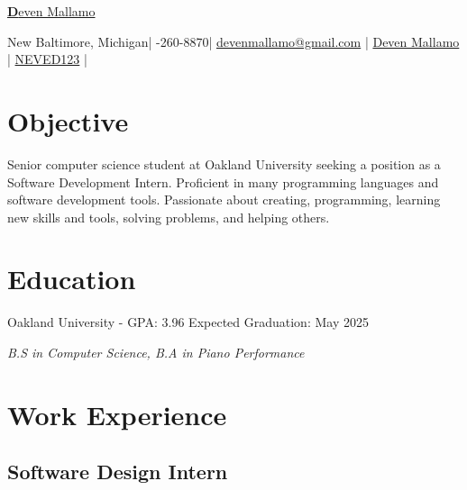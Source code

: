 \documentclass{article}
\makeatletter
\newcommand{\resumesection}[1]{
	\section*{\Large\textbf{#1}}
	\hrulefill
	\vspace{1ex}
}
\newcommand{\name}{Deven Mallamo}
\newcommand{\address}{New Baltimore, Michigan}
\newcommand{\phone}{586-260-8870}
\newcommand{\email}{devenmallamo@gmail.com}
\newcommand{\linkedin}{Deven Mallamo}
\newcommand{\github}{NEVED123}
\makeatother
\begin{document}
\begin{tcolorbox}[colback= boxfill,colframe=boxframe]
	\begin{center}
		\vspace{5pt}
		\href{https://devenmallamo.com}{\Huge \textbf \name} 

		\normalsize \vspace{10pt}

		\faHome \space \address \space | 
		\faPhone \space \phone \space |
		\href{mailto:\email}{\faEnvelope \space \email} \space | 
		\href{https://www.linkedin.com/in/deven-mallamo/}{\faLinkedin \space \linkedin} \space | 
		\href{https://github.com/NEVED123}{\faGithub \space \github} |
	\end{center}
\end{tcolorbox}

\vspace{1ex}

\resumesection{Objective}

\vspace{.2ex}	

Senior computer science student at Oakland University seeking a position as a Software Development Intern. Proficient in many programming languages and software development tools. Passionate about creating, programming, learning new skills and tools, solving problems, and helping others.

\vspace{.5ex}	


\resumesection{Education}

\vspace{.2ex}	

Oakland University - GPA: 3.96 \hfill Expected Graduation: May 2025

\textit {B.S in Computer Science, B.\hspace{49152sp}A in Piano Performance} 

\vspace{.5ex}


\resumesection{Work Experience}

\subsection*{Software Design Intern} 
\end{document}
